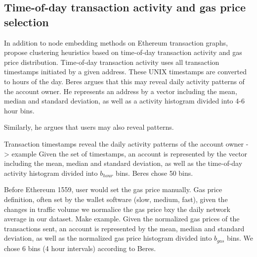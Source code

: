 \documentclass[12pt,a4paper,titlepage,oneside,english]{article}
\begin{document}
\iffalse
\textbf{Diff2Vec} %
The intuition of Diff2Vec is to summarize a node by its neighborhood through a diffusion-like random process. Specifically, there are four steps to Diff2Vec: 1) Generating a diffusion graph, 2) sampling a node sequence, 3) extracting features, 4) learning a neural network embedding
\textbf{DeepWalk}
\textbf{Role2Vec} %
Random walks will likely visit nearby vertices first, which makes them
suitable for finding communities, rather than roles (structural
similarity). To overcome the above problems, we propose the Role2Vec
framework which serves as a basis for generalizing many existing methods that use traditional random walks. Strucural feature matrix.

Research in node embedding has been accelerated by Word2Vec, which is an embedding method for natural language processing. This approach has been extended to learn graph/network embeddings.

Token networks -> Victor, Casale Brunet
\fi


\subsection{Time-of-day transaction activity and gas price selection}

In addition to node embedding methods on Ethereum transaction graphs, \cite{Beres2020} propose  clustering heuristics based on time-of-day transaction activity and gas price distribution. \newline
Time-of-day transaction activity uses all transaction timestamps initiated by a given address. These UNIX timestamps are converted to hours of the day. Beres argues that this may reveal daily activity patterns of the account owner. He represents an address by a vector including the mean, median and standard deviation, as well as a activity histogram divided into 4-6 hour bins.

Similarly, he argues that users may also reveal patterns.

Transaction timestamps reveal the daily activity patterns of the account owner -> example
Given the set of timestamps, an account is represented by the vector including the mean, median and standard deviation, as well as the time-of-day activity histogram divided into $b_{hour}$ bins. Beres chose 50 bins.

Before Ethereum 1559, user would set the gas price manually.
Gas price definition, often set by the wallet software (slow, medium, fast), given the changes in traffic volume we normalice the gas price bxy the daily network average in our dataset. Make example. Given the normalized gas prices of the transactions sent, an account is represented by the mean, median and standard deviation, as well as the normalized gas price histogram divided into $b_{gas}$ bins. We chose 6 bins (4 hour intervals) according to Beres.
\end{document}
